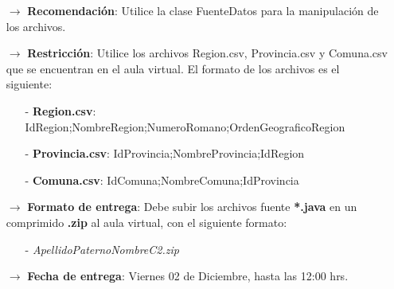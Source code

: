 \documentclass[10pt]{article}
\begin{document}
{\begin{enumerate}
\begin{itemize}
            \item[$\rightarrow$] \textbf{Recomendaci\'on}: Utilice la clase FuenteDatos para la manipulaci\'on de los archivos.
            \item[$\rightarrow$] \textbf{Restricci\'on}: Utilice los archivos Region.csv, Provincia.csv y Comuna.csv que se encuentran en el aula virtual. El formato de los archivos es el siguiente:
            \begin{itemize}
                \item[-] \textbf{Region.csv}: IdRegion;NombreRegion;NumeroRomano;OrdenGeograficoRegion
                \item[-] \textbf{Provincia.csv}: IdProvincia;NombreProvincia;IdRegion
                \item[-] \textbf{Comuna.csv}: IdComuna;NombreComuna;IdProvincia
            \end{itemize}
            \item[$\rightarrow$] \textbf{Formato de entrega}: Debe subir los archivos fuente \textbf{*.java} en un comprimido \textbf{.zip} al aula virtual, con el siguiente formato:
            \begin{itemize}
                \item[-] \emph{ApellidoPaternoNombreC2.zip}
            \end{itemize}
            \item[$\rightarrow$] \textbf{Fecha de entrega}: Viernes 02 de Diciembre, hasta las 12:00 hrs.
        \end{itemize}
	\end{enumerate}}
\end{document}
